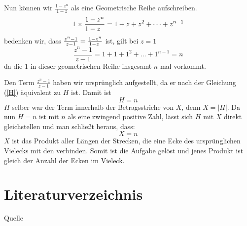 \documentclass[a4paper,12pt]{article} %
\begin{document}
Nun können wir $\frac{1-z^n}{1-z}$ als eine Geometrische Reihe aufschreiben.
\[1\times\frac{1-z^n}{1-z\hspace{2mm}}=1+z+z^2+\dots+z^{n-1}\]
bedenken wir, dass $\frac{z^n-1}{z-1}=\frac{1-z^n}{1-z\hspace{1mm}}$ ist, gilt bei $z=1$
\[\frac{z^n-1}{z-1}=1+1+1^2+\dots+1^{n-1}=n\]
da die $1$ in dieser geometrischen Reihe insgesamt $n$ mal vorkommt.

Den Term $\frac{z^n-1}{z-1}$ haben wir ursprünglich aufgestellt, da er nach der Gleichung (\ref{H}) äquivalent zu $H$ ist. Damit ist
\[H=n\]
$H$ selber war der Term innerhalb der Betragsstriche von $X$, denn $X=|H|$.
Da nun $H=n$ ist mit $n$ als eine zwingend positive Zahl, lässt sich $H$ mit $X$ direkt gleichstellen und man schließt heraus, dass:
\[X=n\]
$X$ ist das Produkt aller Längen der Strecken, die eine Ecke des ursprünglichen Vielecks mit den verbinden. Somit ist die Aufgabe gelöst und jenes Produkt ist gleich der Anzahl der Ecken im Vieleck.





\section{Literaturverzeichnis}

\renewcommand{\refname}{Literaturverzeichnis}  %

\begin{thebibliography}{9}
	 Quelle
	
\end{thebibliography}
\end{document}
